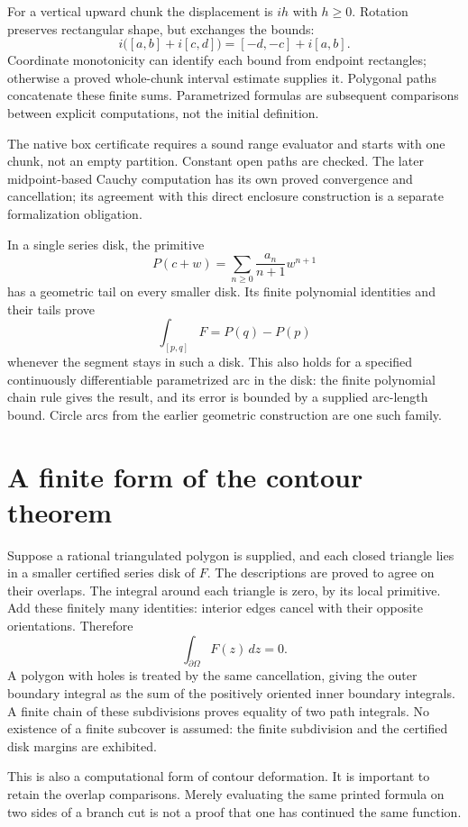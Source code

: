 For a vertical upward chunk the displacement is $ih$ with $h\ge0$.
Rotation preserves rectangular shape, but exchanges the bounds:
\[
 i\bigl([a,b]+i[c,d]\bigr)=[-d,-c]+i[a,b].
\]
Coordinate monotonicity can identify each bound from endpoint rectangles;
otherwise a proved whole-chunk interval estimate supplies it. Polygonal
paths concatenate these finite sums. Parametrized formulas are subsequent
comparisons between explicit computations, not the initial definition.

The native box certificate requires a sound range evaluator and starts
with one chunk, not an empty partition. Constant open paths are checked.
The later midpoint-based Cauchy computation has its own proved convergence
and cancellation; its agreement with this direct enclosure construction
is a separate formalization obligation.

In a single series disk, the primitive
\[
 P(c+w)=\sum_{n\ge0}\frac{a_n}{n+1}w^{n+1}
\]
has a geometric tail on every smaller disk.  Its finite polynomial
identities and their tails prove
\[
 \int_{[p,q]}F=P(q)-P(p)
\]
whenever the segment stays in such a disk.  This also holds for a
specified continuously differentiable parametrized arc in the disk: the
finite polynomial chain rule gives the result, and its error is bounded
by a supplied arc-length bound.  Circle arcs from the earlier geometric
construction are one such family.

\section{A finite form of the contour theorem}
\label{thm:finite-contour}
Suppose a rational triangulated polygon is supplied, and each closed
triangle lies in a smaller certified series disk of $F$.  The descriptions
are proved to agree on their overlaps.  The integral around each triangle
is zero, by its local primitive.  Add these finitely many identities:
interior edges cancel with their opposite orientations.  Therefore
\[
 \int_{\partial\Omega}F(z)\,dz=0.
\]
A polygon with holes is treated by the same cancellation, giving the
outer boundary integral as the sum of the positively oriented inner
boundary integrals.  A finite chain of these subdivisions proves equality
of two path integrals.  No existence of a finite subcover is assumed:
the finite subdivision and the certified disk margins are exhibited.

This is also a computational form of contour deformation.  It is
important to retain the overlap comparisons.  Merely evaluating the
same printed formula on two sides of a branch cut is not a proof that
one has continued the same function.

